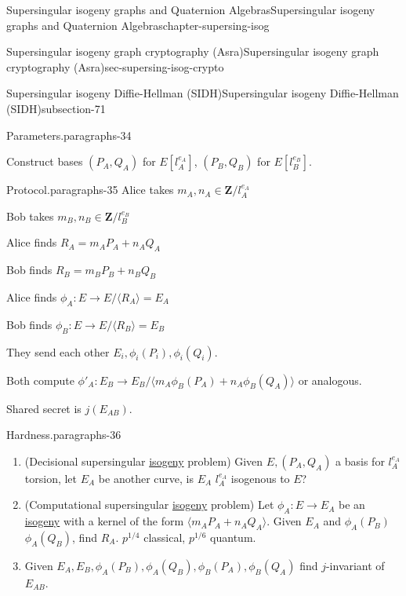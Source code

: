 \documentclass[oneside,10pt,]{book}
\numberwithin{equation}{section}
\newcommand{\lb}{[}
\newcommand{\rb}{]}
\newcommand{\ZZ}{\mathbf{Z}}
\begin{document}
\begin{chapterptx}{Supersingular isogeny graphs and Quaternion Algebras}{}{Supersingular isogeny graphs and Quaternion Algebras}{}{}{chapter-supersing-isog}
\begin{sectionptx}{Supersingular isogeny graph cryptography (Asra)}{}{Supersingular isogeny graph cryptography (Asra)}{}{}{sec-supersing-isog-crypto}
\begin{subsectionptx}{Supersingular isogeny Diffie-Hellman (SIDH)}{}{Supersingular isogeny Diffie-Hellman (SIDH)}{}{}{subsection-71}
\begin{paragraphs}{Parameters.}{paragraphs-34}
\par
\hypertarget{p-842}{}%
Construct bases \((P_A, Q_A)\) for \(E\lb l_A^{e_A}\rb\), \((P_B, Q_B)\) for \(E\lb l_B^{e_B}\rb\).%
\end{paragraphs}%
\begin{paragraphs}{Protocol.}{paragraphs-35}%
\hypertarget{p-843}{}%
Alice takes \(m_A,n_A \in \ZZ/l_A^{e_A}\)%
\par
\hypertarget{p-844}{}%
Bob takes \(m_B,n_B \in \ZZ/l_B^{e_B}\)%
\par
\hypertarget{p-845}{}%
Alice finds \(R_A = m_AP_A + n_AQ_A\)%
\par
\hypertarget{p-846}{}%
Bob finds \(R_B = m_BP_B + n_BQ_B\)%
\par
\hypertarget{p-847}{}%
Alice finds \(\phi_A \colon E \to E/\langle R_A\rangle = E_A\)%
\par
\hypertarget{p-848}{}%
Bob finds \(\phi_B \colon E \to E/\langle R_B\rangle = E_B\)%
\par
\hypertarget{p-849}{}%
They send each other \(E_i, \phi_i(P_i),\phi_i(Q_i)\).%
\par
\hypertarget{p-850}{}%
Both compute \(\phi'_A\colon E_B \to E_B/\langle m_A\phi_B(P_A) + n_A\phi_B(Q_A)\rangle\) or analogous.%
\par
\hypertarget{p-851}{}%
Shared secret is \(j(E_{AB})\).%
\end{paragraphs}%
\begin{paragraphs}{Hardness.}{paragraphs-36}%
\hypertarget{p-852}{}%
\leavevmode%
\begin{enumerate}
\item\hypertarget{li-212}{}(Decisional supersingular \hyperref[def-supersing-isog-isog]{isogeny} problem) Given \(E, (P_A,Q_A)\) a basis for \(l_A^{e_A}\) torsion, let \(E_A\) be another curve, is \(E_A\) \(l_A^{e_A}\) isogenous to \(E\)?%
\item\hypertarget{li-213}{}(Computational supersingular \hyperref[def-supersing-isog-isog]{isogeny} problem) Let \(\phi_A \colon E \to E_A\) be an \hyperref[def-supersing-isog-isog]{isogeny} with a kernel of the form \(\langle m_AP_A + n_AQ_A \rangle\). Given \(E_A\) and \(\phi_A(P_B)\) \(\phi_A(Q_B)\), find \(R_A\). \(p^{1/4}\) classical, \(p^{1/6}\) quantum.%
\item\hypertarget{li-214}{}Given \(E_A, E_B, \phi_A(P_B), \phi_A(Q_B), \phi_B(P_A), \phi_B(Q_A)\) find \(j\)-invariant of \(E_{AB}\).%
\end{enumerate}
%
\end{paragraphs}%
\end{subsectionptx}

\end{sectionptx}
\end{chapterptx}
\end{document}
